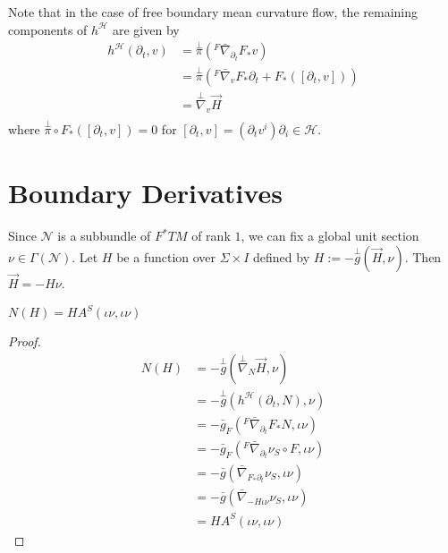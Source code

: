 Note that in the case of free boundary mean curvature flow, the remaining components of $h^{\mathcal{H} }$ are given by
\begin{equation}
\begin{split}
    h^{\mathcal{H} }(\partial_t, v) 
&= \overset{\perp }{\pi} ({}^F \bar{\nabla }_{\partial _t} F_* v)  \\
&= \overset{\perp }{\pi} ({}^F \bar{\nabla }_{v} F_* \partial _t+F_*([\partial_t,v]))  \\
&= \overset{\perp }{\nabla} _v \vec{H}  \\
\end{split}
\end{equation} 
where $\overset{\perp }{\pi} \circ  F_*([\partial_t,v])=0$ for $[\partial _t, v]=(\partial _t v^i) \partial _i \in \mathcal{H} $.

\section{Boundary Derivatives}

Since $\mathcal{N} $ is a subbundle of $F^*TM $  of rank $1$, we can fix a global unit section $\nu \in \Gamma (\mathcal{N} )$. Let $H$ be a function over $\Sigma \times I$ defined by $H:=-\overset{\perp }{g} (\vec{H},\nu )$. Then $\vec{H}=-H \nu $.

\begin{theorem}
    $N(H)=H A^S(\iota \nu , \iota \nu )$ 
\end{theorem}

\begin{proof}

    \begin{equation}
    \begin{split}
        N(H)
    &= - \overset{\perp }{g} (\overset{\perp }{\nabla} _{N}\vec{H}, \nu )\\
    &= - \overset{\perp }{g} (h^{\mathcal{H} }(\partial _t, N), \nu )\\
    &=- \bar{g}_F({}^F \bar{\nabla } _{\partial_t }F_*N, \iota \nu)\\
    &= - \bar{g}_F({}^F \bar{\nabla } _{\partial_t } \nu _S \circ F, \iota \nu)\\
    &= - \bar{g}(\bar{\nabla }_{F_* \partial_t} \nu _S,\iota \nu )\\
    &= - \bar{g}(\bar{\nabla }_{-H \iota \nu } \nu _S,\iota \nu )\\
    &= H A^S(\iota \nu , \iota \nu )
    \end{split}
    \end{equation}  
\end{proof}


